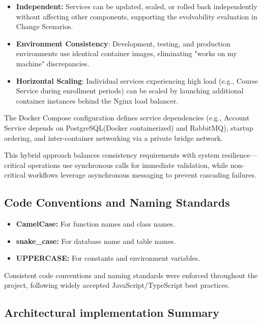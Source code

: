 \begin{itemize}
    \item \textbf{Independent:} Services can be updated, scaled, or rolled back independently 
    without affecting other components, supporting the evolvability evaluation in Change Scenarios.
    
    \item \textbf{Environment Consistency}: Development, testing, and production environments use 
    identical container images, eliminating "works on my machine" discrepancies.
    
    \item \textbf{Horizontal Scaling}: Individual services experiencing high load (e.g., Course Service 
    during enrollment periods) can be scaled by launching additional container instances behind the 
    Nginx load balancer.
\end{itemize}

The Docker Compose configuration defines service dependencies (e.g., Account Service depends on 
PostgreSQL(Docker containerized) and RabbitMQ), startup ordering, and inter-container networking via a private bridge network.

This hybrid approach balances consistency requirements with system resilience—critical operations 
use synchronous calls for immediate validation, while non-critical workflows leverage asynchronous 
messaging to prevent cascading failures.

\subsection{Code Conventions and Naming Standards}
\begin{itemize}
    \item \textbf{CamelCase:} For function names and class names.
    \item \textbf{snake\_case:} For database name and table names.
    \item \textbf{UPPERCASE:} For constants and environment variables.
\end{itemize}
Consistent code conventions and naming standards were enforced throughout the project, following widely accepted JavaScript/TypeScript best practices.


\subsection{Architectural implementation Summary}

